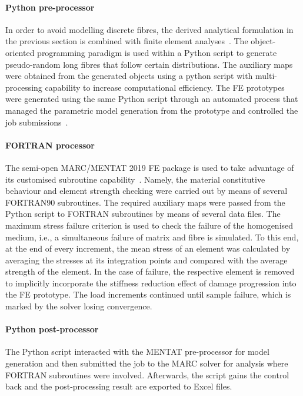 	\paragraph{Python pre-processor} In order to avoid modelling discrete fibres, the derived analytical formulation in the previous section is combined with finite element analyses~\autocite{Oechsner.2016}. The object-oriented programming paradigm is used within a Python script to generate pseudo-random long fibres that follow certain distributions. The auxiliary maps were obtained from the generated objects using a python script with multi-processing capability to increase computational efficiency. The FE prototypes were generated using the same Python script through an automated process that managed the parametric model generation from the prototype and controlled the job submissions~\autocite{Javanbakht.2016}. 

	\paragraph{FORTRAN processor} The semi-open MARC/MENTAT 2019 FE package is used to take advantage of its customised subroutine capability~\autocite{Javanbakht.2017}. Namely, the material constitutive behaviour and element strength checking were carried out by means of several FORTRAN90 subroutines. The required auxiliary maps were passed from the Python script to FORTRAN subroutines by means of several data files. The maximum stress failure criterion is used to check the failure of the homogenised medium, i.e., a simultaneous failure of matrix and fibre is simulated. To this end, at the end of every increment, the mean stress of an element was calculated by averaging the stresses at its integration points and compared with the average strength of the element. In the case of failure, the respective element is removed to implicitly incorporate the stiffness reduction effect of damage progression into the FE prototype. The load increments continued until sample failure, which is marked by the solver losing convergence.  

	\paragraph{Python post-processor} The Python script interacted with the MENTAT pre-processor for model generation and then submitted the job to the MARC solver for analysis where FORTRAN subroutines were involved. Afterwards, the script gains the control back and the post-processing result are exported to Excel files. 

